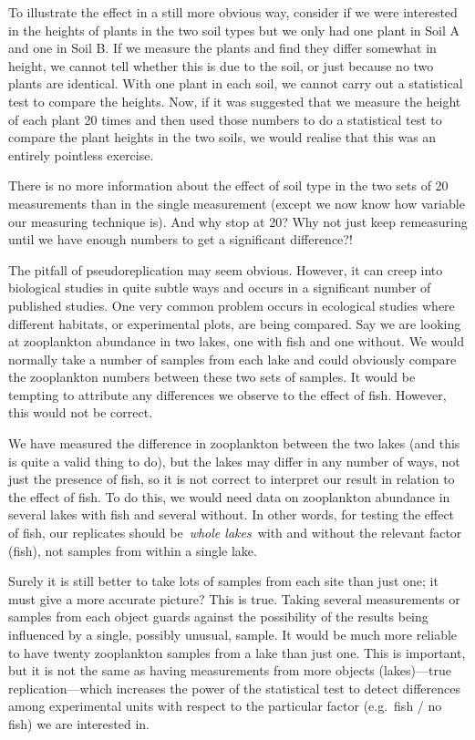 \documentclass[
]{book}
\begin{document}
To illustrate the effect in a still more obvious way, consider if we were interested in the heights of plants in the two soil types but we only had one plant in Soil A and one in Soil B. If we measure the plants and find they differ somewhat in height, we cannot tell whether this is due to the soil, or just because no two plants are identical. With one plant in each soil, we cannot carry out a statistical test to compare the heights. Now, if it was suggested that we measure the height of each plant 20 times and then used those numbers to do a statistical test to compare the plant heights in the two soils, we would realise that this was an entirely pointless exercise.

There is no more information about the effect of soil type in the two sets of 20 measurements than in the single measurement (except we now know how variable our measuring technique is). And why stop at 20? Why not just keep remeasuring until we have enough numbers to get a significant difference?!

The pitfall of pseudoreplication may seem obvious. However, it can creep into biological studies in quite subtle ways and occurs in a significant number of published studies. One very common problem occurs in ecological studies where different habitats, or experimental plots, are being compared. Say we are looking at zooplankton abundance in two lakes, one with fish and one without. We would normally take a number of samples from each lake and could obviously compare the zooplankton numbers between these two sets of samples. It would be tempting to attribute any differences we observe to the effect of fish. However, this would not be correct.

We have measured the difference in zooplankton between the two lakes (and this is quite a valid thing to do), but the lakes may differ in any number of ways, not just the presence of fish, so it is not correct to interpret our result in relation to the effect of fish. To do this, we would need data on zooplankton abundance in several lakes with fish and several without. In other words, for testing the effect of fish, our replicates should be~\emph{whole lakes}~with and without the relevant factor (fish), not samples from within a single lake.

Surely it is still better to take lots of samples from each site than just one; it must give a more accurate picture? This is true. Taking several measurements or samples from each object guards against the possibility of the results being influenced by a single, possibly unusual, sample. It would be much more reliable to have twenty zooplankton samples from a lake than just one. This is important, but it is not the same as having measurements from more objects (lakes)---true replication---which increases the power of the statistical test to detect differences among experimental units with respect to the particular factor (e.g.~fish / no fish) we are interested in.
\end{document}
